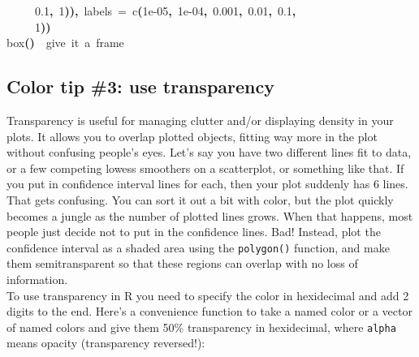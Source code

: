 \documentclass[a4paper]{article}
\newcommand{\hlnumber}[1]{\textcolor[rgb]{0.0823529411764706,0.0784313725490196,0.709803921568627}{#1}}%
\newcommand{\hlfunctioncall}[1]{\textcolor[rgb]{1,0,0}{#1}}%
\newcommand{\hlkeyword}[1]{\textcolor[rgb]{0,0,0}{\textbf{#1}}}%
\newcommand{\hlargument}[1]{\textcolor[rgb]{0.694117647058824,0.247058823529412,0.0196078431372549}{#1}}%
\newcommand{\hlcomment}[1]{\textcolor[rgb]{0.8,0.8,0.8}{#1}}%
\newcommand{\hlprompt}[1]{\textcolor[rgb]{0,0,0}{#1}}%
\newcommand{\hlstd}[1]{\textcolor[rgb]{0,0,0}{#1}}%
\newenvironment{Houtput}{\raggedright}{%
%
}
\begin{document}
\begin{Houtput}
\hlstd{}\hlprompt{{\ }}{\ }{\ }{\ }{\ }\hlnumber{0.1}\hlkeyword{,}{\ }\hlnumber{1}\hlkeyword{)}\hlkeyword{)}\hlkeyword{,}{\ }\hlargument{labels}{\ }\hlargument{=}{\ }\hlfunctioncall{c}\hlkeyword{(}\hlnumber{1e-05}\hlkeyword{,}{\ }\hlnumber{1e-04}\hlkeyword{,}{\ }\hlnumber{0.001}\hlkeyword{,}{\ }\hlnumber{0.01}\hlkeyword{,}{\ }\hlnumber{0.1}\hlkeyword{,}\hspace*{\fill}\\
\hlstd{}\hlprompt{{\ }}{\ }{\ }{\ }{\ }\hlnumber{1}\hlkeyword{)}\hlkeyword{)}\mbox{}
\normalfont
\hspace*{\fill}\\
\hlstd{}\ttfamily\noindent
\hlprompt{\usebox{\hlnormalsizeboxgreaterthan}{\ }}\hlfunctioncall{box}\hlkeyword{(}\hlkeyword{)}{\ }{\ }\hlcomment{\usebox{\hlnormalsizeboxhash}{\ }give{\ }it{\ }a{\ }frame}\mbox{}
\normalfont
\hspace*{\fill}\\
\hlstd{}
\end{Houtput}
{\tikzexternaldisable

}
\subsection{Color tip \#3: use transparency}
Transparency is useful for managing clutter and/or displaying density in your plots. It allows you to overlap plotted objects, fitting way more in the plot without confusing people's eyes. Let's say you have two different lines fit to data, or a few competing lowess smoothers on a scatterplot, or something like that. If you put in confidence interval lines for each, then your plot suddenly has 6 lines. That gets confusing. You can sort it out a bit with color, but the plot quickly becomes a jungle as the number of plotted lines grows. When that happens, most people just decide not to put in the confidence lines. Bad! Instead, plot the confidence interval as a shaded area using the \texttt{polygon()} function, and make them semitransparent so that these regions can overlap with no loss of information.\\

To use transparency in R you need to specify the color in hexidecimal and add 2 digits to the end. Here's a convenience function to take a named color or a vector of named colors and give them 50\% transparency in hexidecimal, where \texttt{alpha} means opacity (transparency reversed!):
\end{document}

